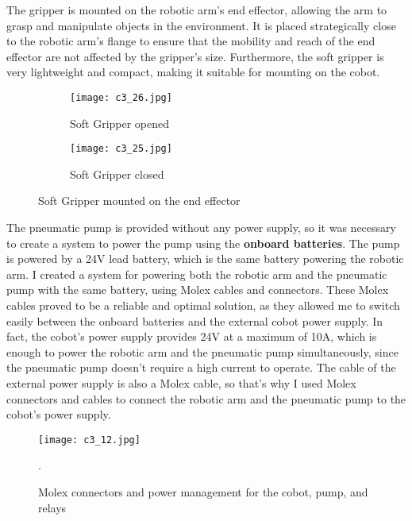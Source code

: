 The gripper is mounted on the robotic arm's end effector, allowing the arm to grasp and manipulate
objects in the environment. It is placed strategically close to the robotic arm's flange to ensure
that the mobility and reach of the end effector are not affected by the gripper's size.
Furthermore, the soft gripper is very lightweight and compact, making it suitable for mounting on the cobot.

\begin{figure}[t]
    \centering
    \begin{subfigure}{0.45\textwidth}
        \texttt{[image: c3\_26.jpg]}
        \caption{Soft Gripper opened}
        \label{fig:opened}
    \end{subfigure}
    \hfill %
    \begin{subfigure}{0.45\textwidth}
        \texttt{[image: c3\_25.jpg]}
        \caption{Soft Gripper closed}
        \label{fig:closed}
    \end{subfigure}
    \caption{Soft Gripper mounted on the end effector}
    \label{fig:sg_combined}
\end{figure}

The pneumatic pump is provided without any power supply, so it was necessary to create a system to power the pump
using the \textbf{onboard batteries}. The pump is powered by a 24V lead battery, which is the same battery powering
the robotic arm. I created a system for powering both the robotic arm and the pneumatic pump with the same battery,
using Molex cables and connectors. These Molex cables proved to be a reliable and optimal solution,
as they allowed me to switch easily between the onboard batteries and the external cobot power supply.
In fact, the cobot's power supply provides 24V at a maximum of 10A, which is enough to power the robotic arm
and the pneumatic pump simultaneously, since the pneumatic pump doesn't require a high current to operate.
The cable of the external power supply is also a Molex cable, so that's why I used Molex connectors and cables
to connect the robotic arm and the pneumatic pump to the cobot's power supply.

\begin{figure}[t]
    \centering
    \texttt{[image: c3\_12.jpg]}
    \captionsetup{width=1\linewidth}
    \caption{Molex connectors and power management for the cobot, pump, and relays}.
    \label{fig:c3_img12}
\end{figure}

